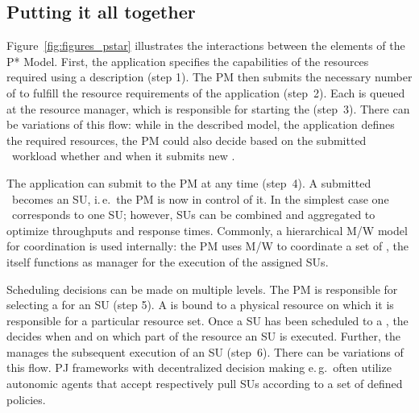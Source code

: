 \documentclass[conference]{IEEEtran}
\begin{document}
\subsection{Putting it all together} 


Figure~\ref{fig:figures_pstar}
illustrates the interactions between the elements of the P* Model. First, the application specifies the capabilities of the
resources required using a \pilotjob description (step 1). The PM then
submits the necessary number of \pilots  to fulfill the
resource requirements of the application (step~2). Each \pilot is
queued at the resource manager, which is responsible for starting the
\pilot (step~3). There can be variations of this flow: while in the
described model, the application defines the required resources, the
PM could also decide based on the submitted \cu \ workload whether and
when it submits new \pilots.


The application can submit \cus to the PM at any time (step~4). A
submitted \cu \ becomes an SU, i.\,e.\ the PM is now in control of
it. In the simplest case one \cu \ corresponds to one SU; however,
SUs can be combined and aggregated to optimize throughputs and
response times. Commonly, a hierarchical M/W model for coordination
is used internally: the PM uses M/W to coordinate a set of \pilots,
the \pilot itself functions as manager for the execution of the
assigned SUs.


Scheduling decisions can be made on multiple levels. The PM is responsible for
selecting a \pilot for an SU (step 5). A \pilot is bound to a physical resource
on which it is responsible for a particular resource set. Once a SU has been
scheduled to a \pilot, the \pilot decides when and on which part of the resource
an SU is executed.
Further, the \pilot manages the subsequent execution of an SU (step~6).
There can be variations of this flow. 
PJ frameworks with decentralized decision making e.\,g.\ often utilize autonomic 
agents that accept respectively pull SUs according to a set of defined policies.
\end{document}
